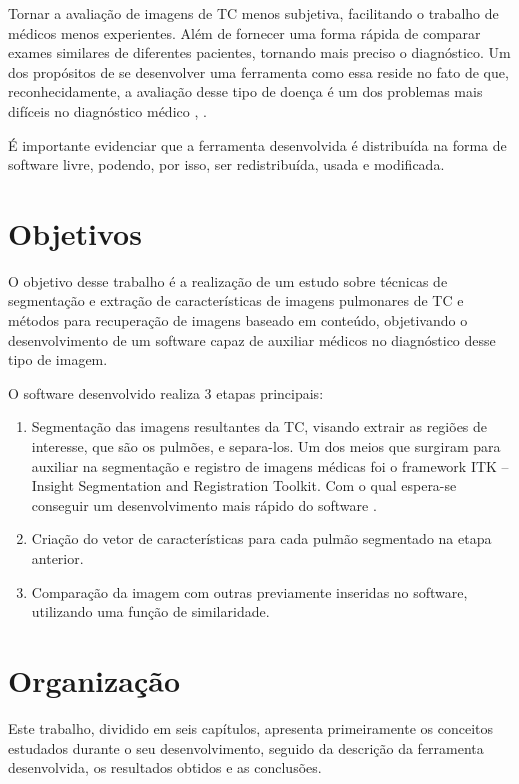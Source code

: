 Tornar a avaliação de imagens de TC menos subjetiva, facilitando o trabalho de médicos menos experientes. Além de fornecer uma forma rápida de comparar exames similares de diferentes pacientes, tornando mais preciso o diagnóstico. Um dos propósitos de se desenvolver uma ferramenta como essa reside no fato de que, reconhecidamente, a avaliação desse tipo de doença é um dos problemas mais difíceis no diagnóstico médico \cite{doi}, \cite{bick}.

É importante evidenciar que a ferramenta desenvolvida é distribuída na forma de software livre, podendo, por isso, ser redistribuída, usada e modificada.

\section{Objetivos}

O objetivo desse trabalho é a realização de um estudo sobre técnicas de segmentação e extração de características de imagens pulmonares de TC e métodos para recuperação de imagens baseado em conteúdo, objetivando o desenvolvimento de um software capaz de auxiliar médicos no diagnóstico desse tipo de imagem.

O software desenvolvido realiza 3 etapas principais:
\begin{enumerate}
 \item Segmentação das imagens resultantes da TC, visando extrair as regiões de interesse, que são os pulmões, e separa-los. Um dos meios que surgiram para auxiliar na segmentação e registro de imagens médicas foi o framework ITK – Insight Segmentation and Registration Toolkit. Com o qual espera-se conseguir um desenvolvimento mais rápido do software \cite{yoo}.
 \item Criação do vetor de características para cada pulmão segmentado na etapa anterior.
 \item Comparação da imagem com outras previamente inseridas no software, utilizando uma função de similaridade.
\end{enumerate}

\section{Organização}

Este trabalho, dividido em seis capítulos, apresenta primeiramente os conceitos estudados durante o seu desenvolvimento, seguido da descrição da ferramenta desenvolvida, os resultados obtidos e as conclusões.

